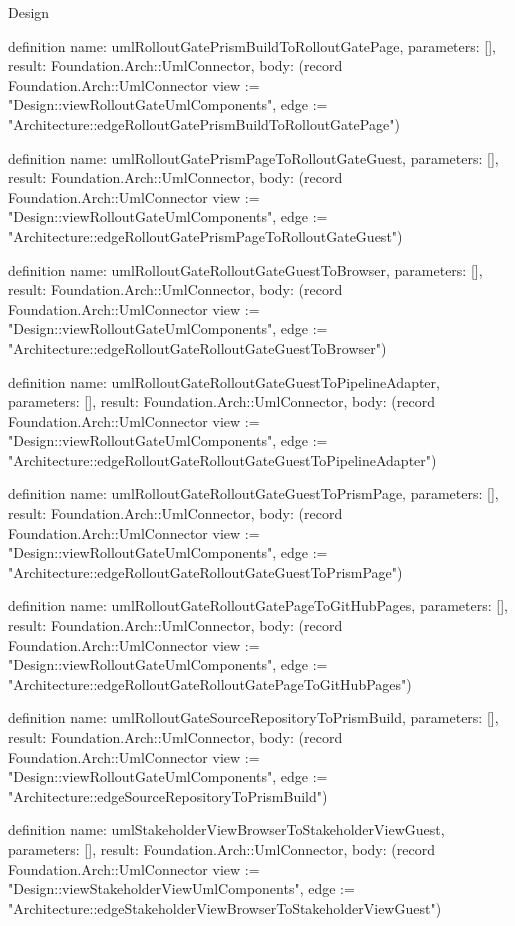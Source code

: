 \begin{lexlean}{Design}
\begin{semanticmodule}
definition{
  name: umlRolloutGatePrismBuildToRolloutGatePage,
  parameters: [],
  result: Foundation.Arch::UmlConnector,
  body: (record Foundation.Arch::UmlConnector {view := "Design::viewRolloutGateUmlComponents", edge := "Architecture::edgeRolloutGatePrismBuildToRolloutGatePage"})
}

definition{
  name: umlRolloutGatePrismPageToRolloutGateGuest,
  parameters: [],
  result: Foundation.Arch::UmlConnector,
  body: (record Foundation.Arch::UmlConnector {view := "Design::viewRolloutGateUmlComponents", edge := "Architecture::edgeRolloutGatePrismPageToRolloutGateGuest"})
}

definition{
  name: umlRolloutGateRolloutGateGuestToBrowser,
  parameters: [],
  result: Foundation.Arch::UmlConnector,
  body: (record Foundation.Arch::UmlConnector {view := "Design::viewRolloutGateUmlComponents", edge := "Architecture::edgeRolloutGateRolloutGateGuestToBrowser"})
}

definition{
  name: umlRolloutGateRolloutGateGuestToPipelineAdapter,
  parameters: [],
  result: Foundation.Arch::UmlConnector,
  body: (record Foundation.Arch::UmlConnector {view := "Design::viewRolloutGateUmlComponents", edge := "Architecture::edgeRolloutGateRolloutGateGuestToPipelineAdapter"})
}

definition{
  name: umlRolloutGateRolloutGateGuestToPrismPage,
  parameters: [],
  result: Foundation.Arch::UmlConnector,
  body: (record Foundation.Arch::UmlConnector {view := "Design::viewRolloutGateUmlComponents", edge := "Architecture::edgeRolloutGateRolloutGateGuestToPrismPage"})
}

definition{
  name: umlRolloutGateRolloutGatePageToGitHubPages,
  parameters: [],
  result: Foundation.Arch::UmlConnector,
  body: (record Foundation.Arch::UmlConnector {view := "Design::viewRolloutGateUmlComponents", edge := "Architecture::edgeRolloutGateRolloutGatePageToGitHubPages"})
}

definition{
  name: umlRolloutGateSourceRepositoryToPrismBuild,
  parameters: [],
  result: Foundation.Arch::UmlConnector,
  body: (record Foundation.Arch::UmlConnector {view := "Design::viewRolloutGateUmlComponents", edge := "Architecture::edgeSourceRepositoryToPrismBuild"})
}

definition{
  name: umlStakeholderViewBrowserToStakeholderViewGuest,
  parameters: [],
  result: Foundation.Arch::UmlConnector,
  body: (record Foundation.Arch::UmlConnector {view := "Design::viewStakeholderViewUmlComponents", edge := "Architecture::edgeStakeholderViewBrowserToStakeholderViewGuest"})
}


\end{semanticmodule}
\end{lexlean}
